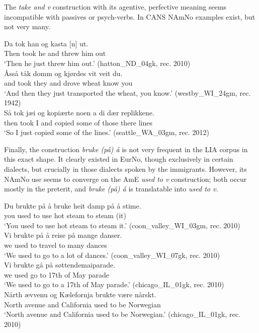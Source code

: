 \documentclass[output=paper]{langscibook}
\begin{document}
The \textit{take and v} construction with its agentive, perfective meaning seems incompatible with passives or psych-verbs. In CANS NAmNo examples exist, but not very many. 

\ea%
    \label{ex:eide:20}
    \ea   
    \gll      Da tok han og kasta [n] ut.        \\
             Then took he and threw him out        \\
    \glt     ‘Then he just threw him out.’ (hatton\_ND\_04gk, rec. 2010)\\
    \ex    
    \gll   Åsså tåk domm og kjørdes vit veit du.      \\
           and took they and drove wheat know you    \\
    \glt   ‘And then they just transported the wheat, you know.’ (westby\_WI\_24gm, rec. 1942)\\
    \ex  
    \gll Så tok jæi og kopiærte noen a di dær replikkene. \\
         then took I and copied some of those there lines \\
    \glt ‘So I just copied some of the lines.’ (seattle\_WA\_03gm, rec. 2012)\\
    \z %
\z

Finally, the construction \textit{bruke (på) å} is not very frequent in the LIA corpus in this exact shape. It clearly existed in EurNo, though exclusively in certain dialects, but crucially in those dialects spoken by the immigrants. However, its NAmNo use seems to converge on the AmE \textit{used to v} construction; both occur mostly in the preterit, and \textit{bruke (på) å} is translatable into \textit{used to v.} 

\ea%
    \label{ex:eide:21}
    \ea \label{ex:eide:21a} 
    \gll     Du brukte på å bruke heit damp på å stime.     \\
             you used {} to  use hot steam {} to  steam (it)      \\
    \glt     ‘You used to use hot steam to steam it.’ (coon\_valley\_WI\_03gm, rec. 2010)\\
    \ex  \label{ex:eide:21b} 
    \gll  Vi brukte på å reise på mange danser. \\
          we used {} to travel to many dances      \\
    \glt  ‘We used to go to a lot of dances.’ (coon\_valley\_WI\_07gk, rec. 2010)\\
    \ex \label{ex:eide:21c}  
    \gll  Vi brukte gå på søttendemaiparade.      \\
          we used go to {17th of May parade}      \\
    \glt  ‘We used to go to a 17th of May parade.’ (chicago\_IL\_01gk, rec. 2010)\\
    \ex \label{ex:eide:21d} 
    \gll Nårth ævvenu og Kælefornja brukte være nårskt.  \\
         North avenue and California {used to} be Norwegian  \\
    \glt ‘North avenue and California used to be Norwegian.’ (chicago\_IL\_01gk, rec. 2010)\\
    \z %
\z    
\end{document}
